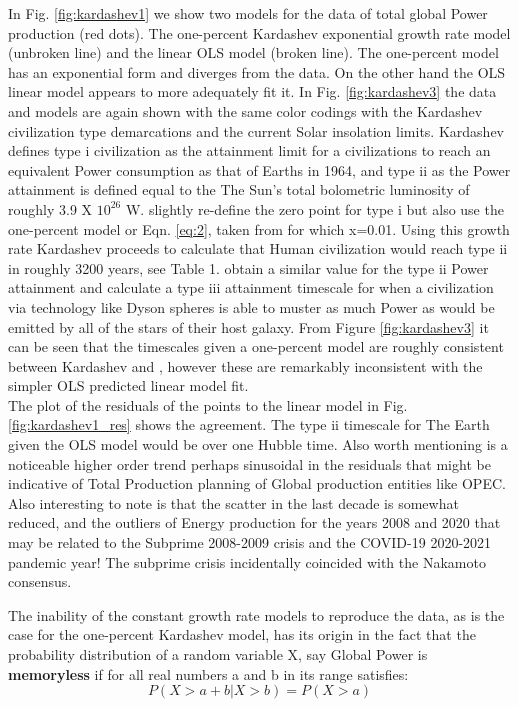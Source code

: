 \documentclass[final,5p,times,twocolumn,authoryear]{elsarticle}
\begin{document}
In Fig. \ref{fig:kardashev1} we show two models for the data of total global Power production (red dots). The one-percent Kardashev exponential growth rate model (unbroken line) and the linear OLS model (broken line). The one-percent model has an exponential form and diverges from the data. On the other hand the OLS linear model appears to more adequately fit it. In Fig. \ref{fig:kardashev3} the data and models are again shown with the same color codings with the Kardashev civilization type demarcations and the current Solar insolation limits. Kardashev defines type i civilization as the attainment limit for a civilizations to reach an equivalent Power consumption as that of Earths in 1964, and type ii as the Power attainment is defined equal to the The Sun's total bolometric luminosity of roughly 3.9 X $10^{26}$ W. \cite{sagan73} slightly re-define the zero point for type i but \cite{sagan73} also use the one-percent model or Eqn. \ref{eq:2}, taken from \cite{kar64} for which x=0.01. Using  this growth rate Kardashev proceeds to calculate that Human civilization would reach type ii in roughly 3200 years, see Table 1. \cite{sagan73} obtain a similar value for the type ii Power attainment and calculate a type iii attainment timescale for when a civilization via technology like Dyson spheres is able to muster as much Power as would be emitted by all of the stars of their host galaxy. From Figure \ref{fig:kardashev3} it can be seen that the timescales given a one-percent model are roughly consistent between Kardashev and \cite{sagan73}, however these are remarkably inconsistent with the simpler OLS predicted linear model fit. \\  
The plot of the residuals of the points to the linear model in Fig. \ref{fig:kardashev1_res} shows the agreement. 
The type ii timescale for The Earth given the OLS model would be over one Hubble time. Also worth mentioning is a noticeable higher order trend perhaps sinusoidal in the residuals that might be indicative of Total Production planning of Global production entities like OPEC. Also interesting to note is that the scatter in the last decade is somewhat reduced, and the outliers of Energy production for the years 2008 and 2020 that may be related to the Subprime 2008-2009 crisis and the COVID-19 2020-2021 pandemic year! The subprime crisis incidentally coincided with the Nakamoto consensus. 

The inability of the constant growth rate models to reproduce the data, as is the case for the one-percent Kardashev model, has its origin in the fact that the probability distribution of a random variable X, say Global Power is \textbf{memoryless} if for all real numbers a and b in its range satisfies:
\begin{equation}
P(X>a +b|X>b)=P(X>a)
\label{eqn:memless}
\end{equation}
\end{document}
